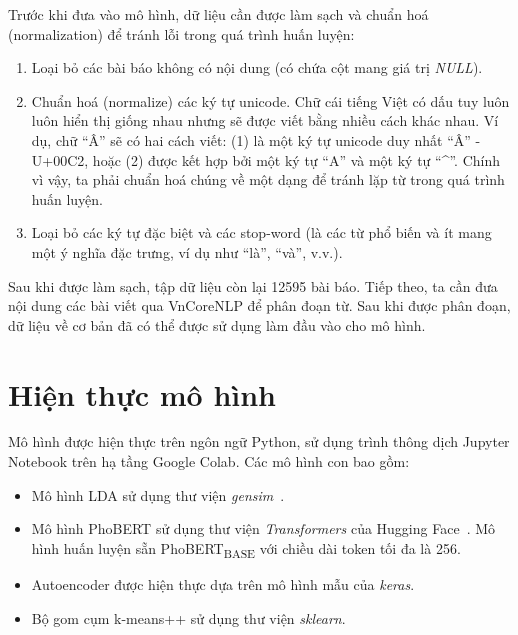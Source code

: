 Trước khi đưa vào mô hình, dữ liệu cần được làm sạch và chuẩn hoá
(normalization) để tránh lỗi trong quá trình huấn luyện:
\begin{enumerate}
    \item Loại bỏ các bài báo không có nội dung (có chứa cột mang giá trị
        \textit{NULL}).
    \item Chuẩn hoá (normalize) các ký tự unicode. Chữ cái tiếng Việt có dấu
        tuy luôn luôn hiển thị giống nhau nhưng sẽ được viết bằng nhiều cách
        khác nhau. Ví dụ, chữ ``Â'' sẽ có hai cách viết: (1) là một ký tự
        unicode duy nhất ``Â'' - U+00C2, hoặc (2) được kết hợp bởi một ký tự
        ``A'' và một ký tự ``\^{}''. Chính vì vậy, ta phải chuẩn hoá chúng về
        một dạng để tránh lặp từ trong quá trình huấn luyện.
    \item Loại bỏ các ký tự đặc biệt và các stop-word (là các từ phổ biến và ít
        mang một ý nghĩa đặc trưng, ví dụ như ``là'', ``và'', v.v.).
\end{enumerate}

Sau khi được làm sạch, tập dữ liệu còn lại 12595 bài báo. Tiếp theo, ta cần đưa
nội dung các bài viết qua VnCoreNLP để phân đoạn từ. Sau khi được phân đoạn, dữ
liệu về cơ bản đã có thể được sử dụng làm đầu vào cho mô hình.

\section{Hiện thực mô hình}
Mô hình được hiện thực trên ngôn ngữ Python, sử dụng trình thông dịch Jupyter
Notebook trên hạ tầng Google Colab. Các mô hình con bao gồm:

\begin{itemize}
    \item Mô hình LDA sử dụng thư viện
        \textit{gensim}~\cite{GensimTopicModelling2021}.
    \item Mô hình PhoBERT sử dụng thư viện \textit{Transformers} của Hugging
        Face~\cite{wolfTransformersStateoftheArtNatural2020}. Mô hình huấn
        luyện sẵn PhoBERT\textsubscript{BASE} với chiều dài token tối đa là
        256.
    \item Autoencoder được hiện thực dựa trên mô hình mẫu của \textit{keras}.
    \item Bộ gom cụm k-means++ sử dụng thư viện \textit{sklearn}.
\end{itemize}

